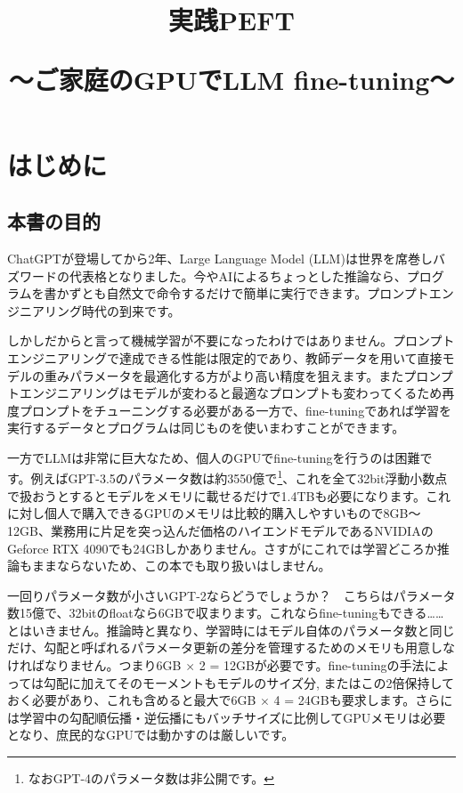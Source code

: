 \documentclass[a5paper,twoside,dvipdfmx]{jsarticle}
\title{実践PEFT

～ご家庭のGPUでLLM fine-tuning～}
\date{}
\begin{document}

\tableofcontents

\newpage

\maketitle

\fontsize{9pt}{16pt}\selectfont

\section{はじめに}

\subsection{本書の目的}

ChatGPTが登場してから2年、Large Language Model (\textsf{LLM})は世界を席巻しバズワードの代表格となりました。今やAIによるちょっとした推論なら、プログラムを書かずとも自然文で命令するだけで簡単に実行できます。プロンプトエンジニアリング時代の到来です。

しかしだからと言って機械学習が不要になったわけではありません。プロンプトエンジニアリングで達成できる性能は限定的であり、教師データを用いて直接モデルの重みパラメータを最適化する方がより高い精度を狙えます。またプロンプトエンジニアリングはモデルが変わると最適なプロンプトも変わってくるため再度プロンプトをチューニングする必要がある一方で、fine-tuningであれば学習を実行するデータとプログラムは同じものを使いまわすことができます。

一方でLLMは非常に巨大なため、個人のGPUでfine-tuningを行うのは困難です。例えばGPT-3.5のパラメータ数は約3550億で\footnote{なおGPT-4のパラメータ数は非公開です。}、これを全て32bit浮動小数点で扱おうとするとモデルをメモリに載せるだけで1.4TBも必要になります。これに対し個人で購入できるGPUのメモリは比較的購入しやすいもので8GB～12GB、業務用に片足を突っ込んだ価格のハイエンドモデルであるNVIDIAのGeforce RTX 4090でも24GBしかありません。さすがにこれでは学習どころか推論もままならないため、この本でも取り扱いはしません。

一回りパラメータ数が小さいGPT-2ならどうでしょうか？　こちらはパラメータ数15億で、32bitのfloatなら6GBで収まります。これならfine-tuningもできる……とはいきません。推論時と異なり、学習時にはモデル自体のパラメータ数と同じだけ、\textsf{勾配}と呼ばれるパラメータ更新の差分を管理するためのメモリも用意しなければなりません。つまり6GB $\times$ 2 = 12GBが必要です。fine-tuningの手法によっては勾配に加えてそのモーメントもモデルのサイズ分, またはこの2倍保持しておく必要があり、これも含めると最大で6GB $\times$ 4 = 24GBも要求します。さらには学習中の勾配順伝播・逆伝播にもバッチサイズに比例してGPUメモリは必要となり、庶民的なGPUでは動かすのは厳しいです。
\end{document}
